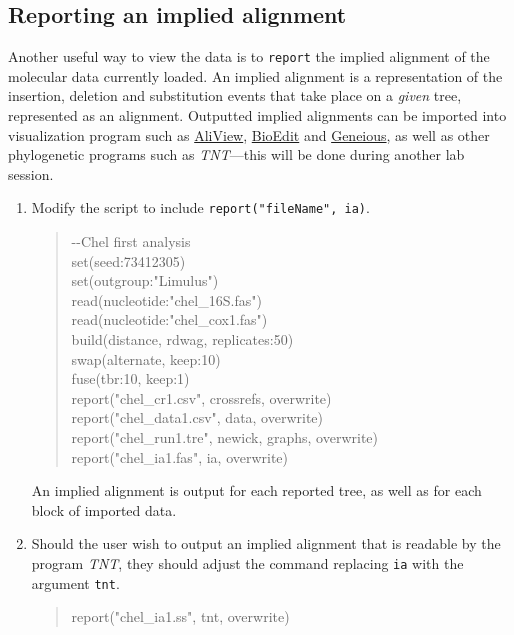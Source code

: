 \documentclass[]{article}
\begin{document}
\subsection{Reporting an implied alignment}
\label{subsec:ia}

Another useful way to view the data is to \texttt{report} the implied alignment of the 
molecular data currently loaded. An implied alignment is a representation of the 
insertion, deletion and substitution events that take place on a \textit{given} tree, 
represented as an alignment. Outputted implied alignments can be imported into 
visualization program such as \href{https://ormbunkar.se/aliview/#DOWNLOAD}{AliView}, 
\href{https://thalljiscience.github.io/}{BioEdit} and \href{https://www.geneious.com}{Geneious}, 
as well as other phylogenetic programs such as \textit{TNT}---this will be done during 
another lab session. 

\begin{enumerate}

\item Modify the script to include \texttt{report("fileName", ia)}.

	\begin{quote}
	-\/-Chel first analysis\\
	set(seed:73412305)\\
	set(outgroup:"Limulus")\\
	read(nucleotide:"chel\_16S.fas")\\
	read(nucleotide:"chel\_cox1.fas")\\
	build(distance, rdwag, replicates:50)\\
	swap(alternate, keep:10)\\
	fuse(tbr:10, keep:1)\\
	report("chel\_cr1.csv", crossrefs, overwrite)\\
	report("chel\_data1.csv", data, overwrite)\\
	report("chel\_run1.tre", newick, graphs, overwrite)\\
	report("chel\_ia1.fas", ia, overwrite)\\
	\end{quote}
	
An implied alignment is output for each reported tree, as well as for each block of imported 
data.

\item Should the user wish to output an implied alignment that is readable by the 
program \textit{TNT}, they should adjust the command  replacing \texttt{ia} with the
argument \texttt{tnt}.

	\begin{quote}
	report("chel\_ia1.ss", tnt, overwrite)\\
	\end{quote}
	
\end{enumerate}
\end{document}
